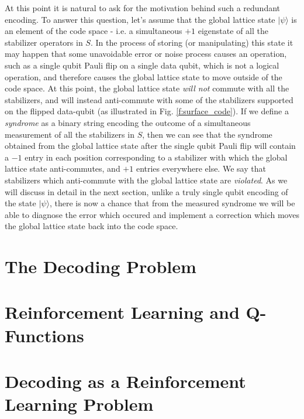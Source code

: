 \documentclass[onecolumn,preprintnumbers,amsmath,amssymb,notitlepage,nofootinbib,longbibliography,superscriptaddress,aps,pra,10pt]{revtex4-1}
\begin{document}
    At this point it is natural to ask for the motivation behind such a redundant encoding. To answer this question, let's assume that the global lattice state $|\psi\rangle$ is an element of the code space - i.e. a simultaneous $+1$ eigenstate of all the stabilizer operators in $S$. In the process of storing (or manipulating) this state it may happen that some unavoidable error or noise process causes an operation, such as a single qubit Pauli flip on a single data qubit, which is not a logical operation, and therefore causes the global lattice state to move outside of the code space. At this point, the global lattice state \textit{will not} commute with all the stabilizers, and will instead anti-commute with some of the stabilizers supported on the flipped data-qubit (as illustrated in Fig. \ref{f:surface_code}). If we define a \textit{syndrome} as a binary string encoding the outcome of a simultaneous measurement of all the stabilizers in $S$, then we can see that the syndrome obtained from the global lattice state after the single qubit Pauli flip will contain a $-1$ entry in each position corresponding to a stabilizer with which the global lattice state anti-commutes, and $+1$ entries everywhere else. We say that stabilizers which anti-commute with the global lattice state are \textit{violated}. As we will discuss in detail in the next section, unlike a truly single qubit encoding of the state $|\psi\rangle$, there is now a chance that from the measured syndrome we will be able to diagnose the error which occured and implement a correction which moves the global lattice state back into the code space. 



\section{The Decoding Problem}\label{s:the_decoding_problem}

\section{Reinforcement Learning and Q-Functions}\label{s:reinforcement_learning}
\section{Decoding as a Reinforcement Learning Problem}\label{s:decoding_as_rl}
\end{document}
